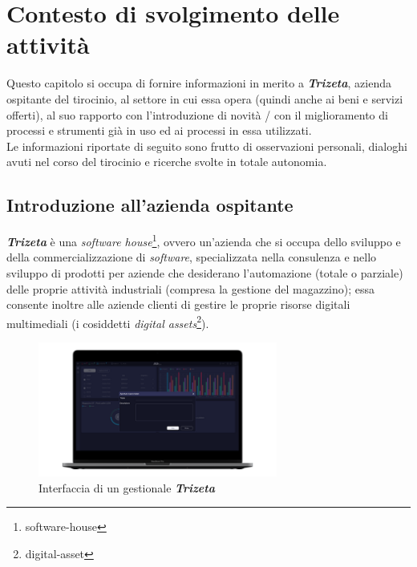 \chapter{Contesto di svolgimento delle attività}
\label{cap:contesto-svolgimento}

Questo capitolo si occupa di fornire informazioni in merito a \textit{\textbf{Trizeta}}, azienda ospitante del tirocinio, al settore in cui essa opera (quindi anche ai beni e servizi offerti), 
al suo rapporto con l'introduzione di novità / con il miglioramento di processi e strumenti già in uso ed ai processi in essa utilizzati. \\
Le informazioni riportate di seguito sono frutto di osservazioni personali, dialoghi avuti nel corso del tirocinio e ricerche svolte in totale autonomia.

\section{Introduzione all'azienda ospitante}

\textit{\textbf{Trizeta}} è una \textit{software house}\footnote{\gls{software-house}}, ovvero un'azienda che si occupa dello sviluppo e della commercializzazione di \textit{software}, specializzata nella consulenza e nello sviluppo
di prodotti per aziende che desiderano l'automazione (totale o parziale) delle proprie attività industriali (compresa la gestione del magazzino); essa consente inoltre alle aziende clienti di gestire le proprie risorse digitali multimediali (i cosiddetti \textit{digital assets}\footnote{\gls{digital-asset}}).
    \begin{figure}[H]
        \centering
        \includegraphics[width=0.7\textwidth]{images/adesuite.png}
        \caption[Interfaccia di un gestionale \textit{\textbf{Trizeta}}]{Interfaccia di un gestionale \textit{\textbf{Trizeta}}\footnotemark}
    \end{figure}

